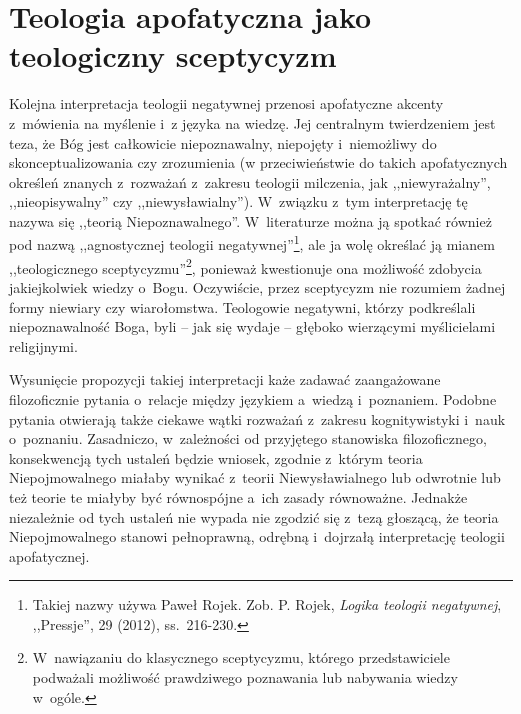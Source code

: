 

\chapter{Teologia apofatyczna jako teologiczny sceptycyzm}\label{scep}




Kolejna interpretacja teologii negatywnej przenosi apofatyczne akcenty z~mówienia na myślenie i~z języka na wiedzę. Jej centralnym twierdzeniem jest teza, że Bóg jest całkowicie niepoznawalny, niepojęty i~niemożliwy do skonceptualizowania czy zrozumienia (w przeciwieństwie do takich apofatycznych określeń znanych z~rozważań z~zakresu teologii milczenia, jak ,,niewyrażalny'', ,,nieopisywalny'' czy ,,niewysławialny''). W~związku z~tym interpretację tę nazywa się ,,teorią Niepoznawalnego''. W~literaturze można ją spotkać również pod nazwą ,,agnostycznej teologii negatywnej''\footnote{Takiej nazwy używa Paweł Rojek. Zob. P. Rojek, \textit{Logika teologii negatywnej}, ,,Pressje'', 29 (2012), ss.~216-230.}, ale ja wolę określać ją mianem ,,teologicznego sceptycyzmu''\footnote{W~nawiązaniu do klasycznego sceptycyzmu, którego przedstawiciele podważali możliwość prawdziwego poznawania lub nabywania wiedzy w~ogóle.}, ponieważ kwestionuje ona możliwość zdobycia jakiejkolwiek wiedzy o~Bogu. Oczywiście, przez sceptycyzm nie rozumiem żadnej formy niewiary czy wiarołomstwa. Teologowie negatywni, którzy podkreślali niepoznawalność Boga, byli -- jak się wydaje -- głęboko wierzącymi myślicielami religijnymi.

Wysunięcie propozycji takiej interpretacji każe zadawać zaangażowane filozoficznie pytania o~relacje między językiem a~wiedzą i~poznaniem. Podobne pytania otwierają także ciekawe wątki rozważań z~zakresu kognitywistyki i~nauk o~poznaniu. Zasadniczo, w~zależności od przyjętego stanowiska filozoficznego, konsekwencją tych ustaleń będzie wniosek, zgodnie z~którym teoria Niepojmowalnego miałaby wynikać z~teorii Niewysławialnego lub odwrotnie lub też teorie te miałyby być równospójne a~ich zasady równoważne. Jednakże niezależnie od tych ustaleń nie wypada nie zgodzić się z~tezą głoszącą, że teoria Niepojmowalnego stanowi pełnoprawną, odrębną i~dojrzałą interpretację teologii apofatycznej.

